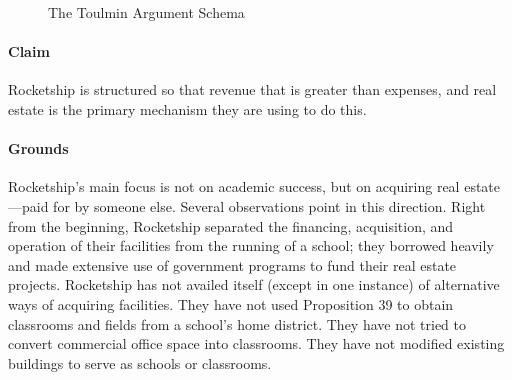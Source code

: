 \begin{figure}[t]
  \caption{The Toulmin Argument Schema}%
  \label{fig:toulmin-arg}\centering%
\end{figure}

\paragraph{Claim}
Rocketship is structured so that revenue that is greater than expenses, and real estate is the primary mechanism they are using to do this.

\paragraph{Grounds}
Rocketship's main focus is not on academic success, but on acquiring real estate—paid for by someone else. Several observations point in this direction. Right from the beginning, Rocketship separated the financing, acquisition, and operation of their facilities from the running of a school; they borrowed heavily and made extensive use of government programs to fund their real estate projects. Rocketship has not availed itself (except in one instance) of alternative ways of acquiring facilities. They have not used Proposition 39 to obtain classrooms and fields from a school's home district. They have not tried to convert commercial office space into classrooms. They have not modified existing buildings to serve as schools or classrooms.

